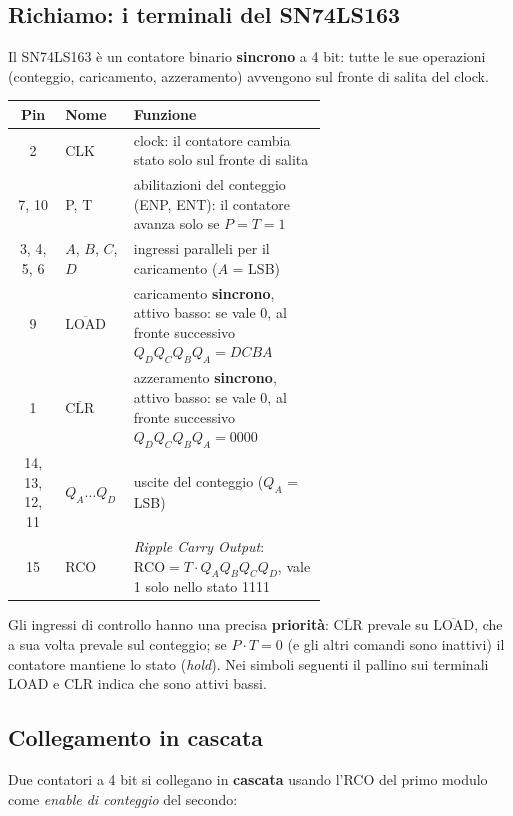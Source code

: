 \subsection{Richiamo: i terminali del SN74LS163}

Il SN74LS163 è un contatore binario \textbf{sincrono} a 4 bit: tutte le sue operazioni
(conteggio, caricamento, azzeramento) avvengono sul fronte di salita del clock.

\begin{center}
\small
\begin{tabular}{c l p{0.62\linewidth}}
\toprule
Pin & Nome & Funzione \\
\midrule
2 & CLK & clock: il contatore cambia stato solo sul fronte di salita \\
7, 10 & P, T & abilitazioni del conteggio (ENP, ENT): il contatore avanza solo se $P=T=1$ \\
3, 4, 5, 6 & $A$, $B$, $C$, $D$ & ingressi paralleli per il caricamento ($A$ = LSB) \\
9 & $\overline{\text{LOAD}}$ & caricamento \textbf{sincrono}, attivo basso: se vale 0, al fronte successivo $Q_DQ_CQ_BQ_A = DCBA$ \\
1 & $\overline{\text{CLR}}$ & azzeramento \textbf{sincrono}, attivo basso: se vale 0, al fronte successivo $Q_DQ_CQ_BQ_A = 0000$ \\
14, 13, 12, 11 & $Q_A \ldots Q_D$ & uscite del conteggio ($Q_A$ = LSB) \\
15 & RCO & \emph{Ripple Carry Output}: $\text{RCO} = T\cdot Q_A Q_B Q_C Q_D$, vale 1 solo nello stato 1111 \\
\bottomrule
\end{tabular}
\end{center}

\noindent Gli ingressi di controllo hanno una precisa \textbf{priorità}:
$\overline{\text{CLR}}$ prevale su $\overline{\text{LOAD}}$, che a sua volta prevale sul
conteggio; se $P\cdot T=0$ (e gli altri comandi sono inattivi) il contatore mantiene lo
stato (\emph{hold}). Nei simboli seguenti il pallino sui terminali LOAD e CLR indica che
sono attivi bassi.

\subsection{Collegamento in cascata}

Due contatori a 4 bit si collegano in \textbf{cascata} usando l'RCO del primo modulo come
\emph{enable di conteggio} del secondo:

